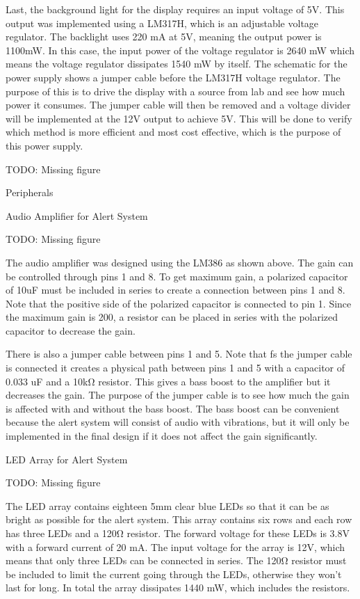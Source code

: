 \documentclass[journal]{IEEEtran}
\begin{document}
Last, the background light for the display requires an input voltage of 5V.  This output was implemented using a LM317H, which is an adjustable voltage regulator.  The backlight uses 220 mA at 5V, meaning the output power is 1100mW.  In this case, the input power of the voltage regulator is 2640 mW which means the voltage regulator dissipates 1540 mW by itself.  The schematic for the power supply shows a jumper cable before the LM317H voltage regulator.  The purpose of this is to drive the display with a source from lab and see how much power it consumes.  The jumper cable will then be removed and a voltage divider will be implemented at the 12V output to achieve 5V.  This will be done to verify which method is more efficient and most cost effective, which is the purpose of this power supply.

TODO: Missing figure

Peripherals

Audio Amplifier for Alert System

TODO: Missing figure

The audio amplifier was designed using the LM386 as shown above.  The gain can be controlled through pins 1 and 8.  To get maximum gain, a polarized capacitor of 10uF must be included in series to create a connection between pins 1 and 8.  Note that the positive side of the polarized capacitor is connected to pin 1.  Since the maximum gain is 200, a resistor can be placed in series with the polarized capacitor to decrease the gain.

There is also a jumper cable between pins 1 and 5.  Note that fs the jumper cable is connected it creates a physical path between pins 1 and 5 with a capacitor of 0.033 uF and a 10kΩ resistor.  This gives a bass boost to the amplifier but it decreases the gain.  The purpose of the jumper cable is to see how much the gain is affected with and without the bass boost.  The bass boost can be convenient because the alert system will consist of audio with vibrations, but it will only be implemented in the final design if it does not affect the gain significantly.

LED Array for Alert System

TODO: Missing figure

The LED array contains eighteen 5mm clear blue LEDs so that it can be as bright as possible for the alert system.  This array contains six rows and each row has three LEDs and a 120Ω resistor.  The forward voltage for these LEDs is 3.8V with a forward current of 20 mA.  The input voltage for the array is 12V, which means that only three LEDs can be connected in series.  The 120Ω resistor must be included to limit the current going through the LEDs, otherwise they won’t last for long.  In total the array dissipates 1440 mW, which includes the resistors.
\end{document}
